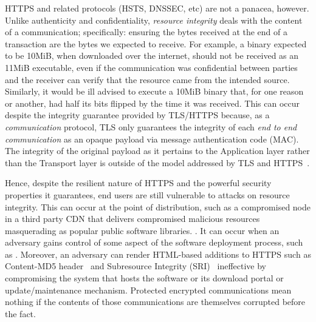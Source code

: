 HTTPS and related protocols (HSTS, DNSSEC, etc) are not a panacea, however.
Unlike authenticity and confidentiality, \textit{resource integrity} deals with
the content of a communication; specifically: ensuring the bytes received at the
end of a transaction are the bytes we expected to receive. For example, a binary
expected to be 10MiB, when downloaded over the internet, should not be received
as an 11MiB executable, even if the communication was confidential between
parties and the receiver can verify that the resource came from the intended
source. Similarly, it would be ill advised to execute a 10MiB binary that, for
one reason or another, had half its bits flipped by the time it was received.
This can occur despite the integrity guarantee provided by TLS/HTTPS because, as
a \textit{communication} protocol, TLS only guarantees the integrity of each
\textit{end to end communication} as an opaque payload via message
authentication code (MAC). The integrity of the original payload as it pertains
to the Application layer rather than the Transport layer is outside of the model
addressed by TLS and HTTPS~\cite{TLS1.2, HTTPS}.


Hence, despite the resilient nature of HTTPS and the powerful security
properties it guarantees, end users are still vulnerable to attacks on resource
integrity. This can occur at the point of distribution, such as a compromised
node in a third party CDN that delivers compromised malicious resources
masquerading as popular public software libraries. . It can occur when an adversary gains control of some
aspect of the software deployment process, such as . Moreover, an adversary can render HTML-based additions to HTTPS
such as Content-MD5 header~\cite{MD5Header} and Subresource Integrity
(SRI)~\cite{SRI} ineffective by compromising the system that hosts the software
or its download portal or update/maintenance mechanism. Protected encrypted
communications mean nothing if the contents of those communications are
themselves corrupted before the fact.




